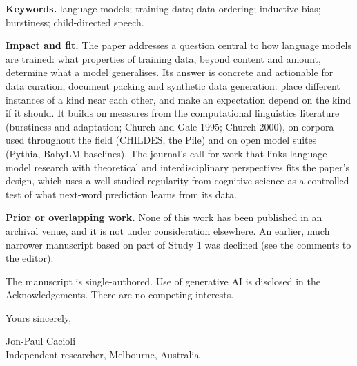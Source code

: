 \documentclass[11pt,a4paper]{article}
\begin{document}
\textbf{Keywords.} language models; training data; data ordering; inductive bias; burstiness; child-directed speech.

\textbf{Impact and fit.} The paper addresses a question central to how language models are trained: what properties of training data, beyond content and amount, determine what a model generalises. Its answer is concrete and actionable for data curation, document packing and synthetic data generation: place different instances of a kind near each other, and make an expectation depend on the kind if it should. It builds on measures from the computational linguistics literature (burstiness and adaptation; Church and Gale 1995; Church 2000), on corpora used throughout the field (CHILDES, the Pile) and on open model suites (Pythia, BabyLM baselines). The journal's call for work that links language-model research with theoretical and interdisciplinary perspectives fits the paper's design, which uses a well-studied regularity from cognitive science as a controlled test of what next-word prediction learns from its data.

\textbf{Prior or overlapping work.} None of this work has been published in an archival venue, and it is not under consideration elsewhere. An earlier, much narrower manuscript based on part of Study 1 was declined (see the comments to the editor).

The manuscript is single-authored. Use of generative AI is disclosed in the Acknowledgements. There are no competing interests.

Yours sincerely,

Jon-Paul Cacioli\\
Independent researcher, Melbourne, Australia
\end{document}
